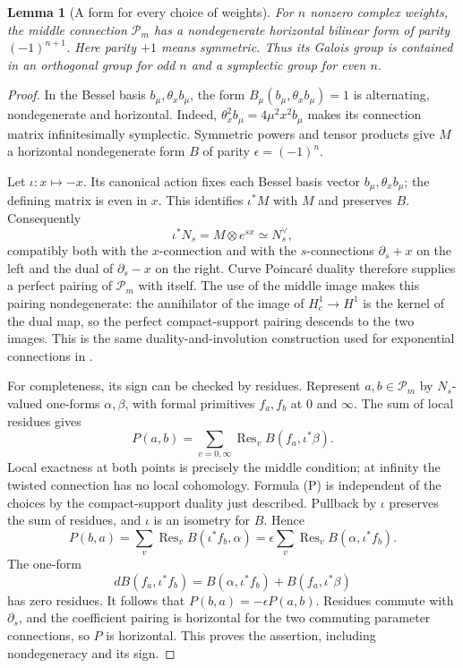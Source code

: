 \documentclass[11pt,a4paper]{article}
\newtheorem{lemma}[theorem]{Lemma}
\theoremstyle{definition}
\theoremstyle{remark}
\numberwithin{equation}{section}
\begin{document}
\begin{lemma}[A form for every choice of weights]\label{p6:fs:pairing}
For $n$ nonzero complex weights, the middle connection $\mathcal P_m$
has a nondegenerate horizontal bilinear form of parity $(-1)^{n+1}$.
Here parity $+1$ means symmetric. Thus its Galois group is contained
in an orthogonal group for odd $n$ and a symplectic group for even $n$.
\end{lemma}
\begin{proof}
In the Bessel basis $b_\mu,\theta_xb_\mu$, the form
$B_\mu(b_\mu,\theta_xb_\mu)=1$ is alternating, nondegenerate and
horizontal. Indeed, $\theta_x^2b_\mu=4\mu^2x^2b_\mu$ makes its
connection matrix infinitesimally symplectic. Symmetric powers and
tensor products give $M$ a horizontal nondegenerate form $B$ of
parity $\epsilon=(-1)^n$.

Let $\iota:x\mapsto-x$. Its canonical action fixes each Bessel
basis vector $b_\mu,\theta_xb_\mu$; the defining matrix is even in
$x$. This identifies $\iota^*M$ with $M$ and preserves $B$.
Consequently
\[
 \iota^*N_s=M\otimes e^{sx}\simeq N_s^\vee,
\]
compatibly both with the $x$-connection and with the $s$-connections
$\partial_s+x$ on the left and the dual of $\partial_s-x$ on the
right. Curve Poincar\'e duality therefore supplies a perfect pairing
of $\mathcal P_m$ with itself. The use of the middle image makes
this pairing nondegenerate: the annihilator of the image of
$H_c^1\to H^1$ is the kernel of the dual map, so the perfect
compact-support pairing descends to the two images. This is the
same duality-and-involution construction used for exponential
connections in \cite[\S2, especially (2.12) and Corollary 2.15]{p6:FS_FSY2022}.

For completeness, its sign can be checked by residues. Represent
$a,b\in\mathcal P_m$ by $N_s$-valued one-forms $\alpha,\beta$,
with formal primitives $f_a,f_b$ at $0$ and $\infty$.
The sum of local residues gives
\[
 P(a,b)=\sum_{v=0,\infty}\operatorname{Res}_v
                         B(f_a,\iota^*\beta).
 \tag{P}
\]
Local exactness at both points is precisely the middle condition;
at infinity the twisted connection has no local cohomology.
Formula (P) is independent of the choices by the compact-support
duality just described. Pullback by $\iota$ preserves the sum of
residues, and $\iota$ is an isometry for $B$. Hence
\[
 P(b,a)=\sum_v\operatorname{Res}_v B(\iota^*f_b,\alpha)
       =\epsilon\sum_v\operatorname{Res}_v B(\alpha,\iota^*f_b).
\]
The one-form
\[
 dB(f_a,\iota^*f_b)
       =B(\alpha,\iota^*f_b)+B(f_a,\iota^*\beta)
\]
has zero residues. It follows that $P(b,a)=-\epsilon P(a,b)$.
Residues commute with $\partial_s$, and the coefficient pairing is
horizontal for the two commuting parameter connections, so $P$ is
horizontal. This proves the assertion, including nondegeneracy and
its sign.
\end{proof}
\end{document}
